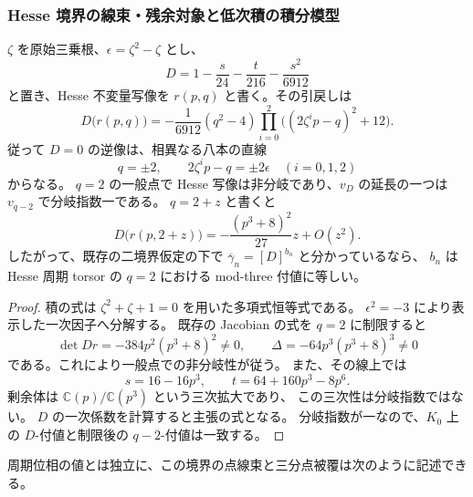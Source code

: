 \subsubsection{Hesse 境界の線束・残余対象と低次積の積分模型}
\label{subsubsec:nfm-hesse-boundary-models}

\begin{lemma}[追加境界の八直線と一つの付値]
\label{lem:nfm-period-hesse-eight-boundary-lines}
$\zeta$ を原始三乗根、$\epsilon=\zeta^2-\zeta$ とし、
\[
 D=1-\frac{s}{24}-\frac{t}{216}-\frac{s^2}{6912}
\]
と置き、Hesse 不変量写像を $r(p,q)$ と書く。その引戻しは
\[
 D\bigl(r(p,q)\bigr)
 =-\frac1{6912}(q^2-4)
       \prod_{i=0}^{2}\bigl((2\zeta^ip-q)^2+12\bigr).
\]
従って $D=0$ の逆像は、相異なる八本の直線
\[
 q=\pm2,\qquad 2\zeta^ip-q=\pm2\epsilon\quad(i=0,1,2)
\]
からなる。
$q=2$ の一般点で Hesse 写像は非分岐であり、$v_D$ の延長の一つは
$v_{q-2}$ で分岐指数一である。
$q=2+z$ と書くと
\[
 D\bigl(r(p,2+z)\bigr)
 =-\frac{(p^3+8)^2}{27}z+O(z^2).
\]
したがって、既存の二境界仮定の下で
$\overline\gamma_n=[D]^{b_n}$ と分かっているなら、
$b_n$ は Hesse 周期 torsor の $q=2$ における mod-three 付値に等しい。
\end{lemma}
\begin{proof}
積の式は $\zeta^2+\zeta+1=0$ を用いた多項式恒等式である。
$\epsilon^2=-3$ により表示した一次因子へ分解する。
既存の Jacobian の式を $q=2$ に制限すると
\[
 \det Dr=-384p^2(p^3+8)^2\ne0,
 \qquad \Delta=-64p^3(p^3+8)^3\ne0
\]
である。これにより一般点での非分岐性が従う。
また、その線上では
\[
 s=16-16p^3,\qquad t=64+160p^3-8p^6.
\]
剰余体は $\mathbb C(p)/\mathbb C(p^3)$ という三次拡大であり、
この三次性は分岐指数ではない。
$D$ の一次係数を計算すると主張の式となる。
分岐指数が一なので、$K_0$ 上の $D$-付値と制限後の $q-2$-付値は一致する。
\end{proof}

周期位相の値とは独立に、この境界の点線束と三分点被覆は次のように記述できる。

